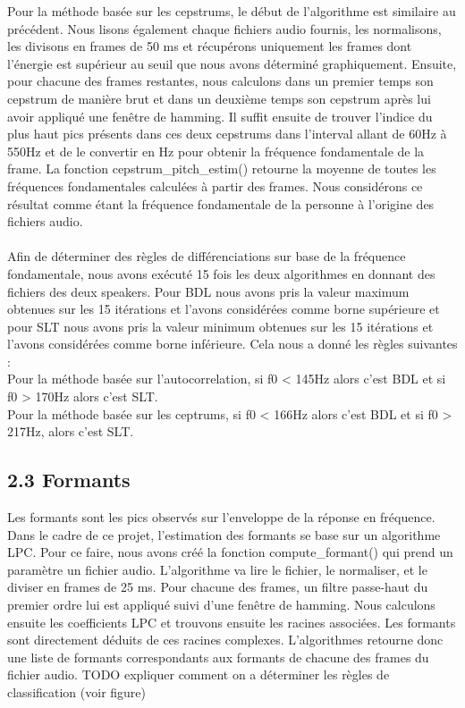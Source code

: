 \documentclass[a4paper,12pt]{report}	%
\begin{document}
Pour la méthode basée sur les cepstrums, le début de l'algorithme est similaire au précédent. Nous lisons également chaque fichiers audio fournis, les normalisons, les divisons en frames de 50 ms et récupérons uniquement les frames dont l'énergie est supérieur au seuil que nous avons déterminé graphiquement. Ensuite, pour chacune des frames restantes, nous calculons dans un premier temps son cepstrum de manière brut et dans un deuxième temps son cepstrum après lui avoir appliqué une fenêtre de hamming. Il suffit ensuite de trouver l'indice du plus haut pics présents dans ces deux cepstrums dans l'interval allant de 60Hz à 550Hz et de le convertir en Hz pour obtenir la fréquence fondamentale de la frame. La fonction cepstrum\_pitch\_estim() retourne la moyenne de toutes les fréquences fondamentales calculées à partir des frames. Nous considérons ce résultat comme étant la fréquence fondamentale de la personne à l'origine des fichiers audio.\\
\\
Afin de déterminer des règles de différenciations sur base de la fréquence fondamentale, nous avons exécuté 15 fois les deux algorithmes en donnant des fichiers des deux speakers. Pour BDL nous avons pris la valeur maximum obtenues sur les 15 itérations et l'avons considérées comme borne supérieure et pour SLT nous avons pris la valeur minimum obtenues sur les 15 itérations et l'avons considérées comme borne inférieure. Cela nous a donné les règles suivantes : \\
Pour la méthode basée sur l'autocorrelation, si f0 < 145Hz alors c'est BDL et si f0 > 170Hz alors c'est SLT. \\
Pour la méthode basée sur les ceptrums, si f0 < 166Hz alors c'est BDL et si f0 > 217Hz, alors c'est SLT. 

{\subsection*{2.3 Formants}}
Les formants sont les pics observés sur l'enveloppe de la réponse en fréquence. Dans le cadre de ce projet, l'estimation des formants se base sur un algorithme LPC. Pour ce faire, nous avons créé la fonction compute\_formant() qui prend un paramètre un fichier audio. L'algorithme va lire le fichier, le normaliser, et le diviser en frames de 25 ms. Pour chacune des frames, un filtre passe-haut du premier ordre lui est appliqué suivi d'une fenêtre de hamming. Nous calculons ensuite les coefficients LPC et trouvons ensuite les racines associées. Les formants sont directement déduits de ces racines complexes. L'algorithmes retourne donc une liste de formants correspondants aux formants de chacune des frames du fichier audio. 
TODO expliquer comment on a déterminer les règles de classification (voir figure)
\end{document}
